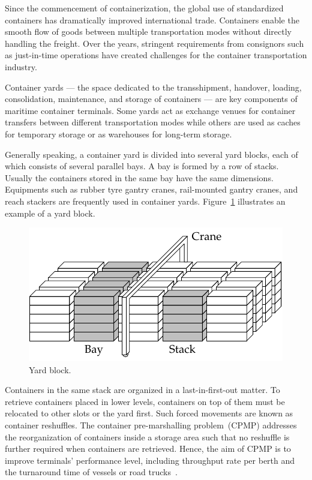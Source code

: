 \documentclass[review,3p,times,12pt,number]{elsarticle}\usepackage{amsmath}\usepackage{amssymb}
\begin{document}
Since the commencement of containerization, the global use of standardized containers has dramatically improved international trade. Containers enable the smooth flow of goods between multiple transportation modes without directly handling the freight. Over the years, stringent requirements from consignors such as just-in-time operations have created challenges for the container transportation industry.

Container yards --- the space dedicated to the transshipment, handover, loading, consolidation, maintenance, and storage of containers --- are key components of maritime container terminals. Some yards act as exchange venues for container transfers between different transportation modes while others are used as caches for temporary storage or as warehouses for long-term storage.

Generally speaking, a container yard is divided into several yard blocks, each of which consists of several parallel bays.  A bay is formed by a row of stacks. Usually the containers stored in the same bay have the same dimensions. Equipments such as rubber tyre gantry cranes, rail-mounted gantry cranes, and reach stackers are frequently used in container yards. Figure~\ref{fig:block} illustrates an example of a yard block.

\begin{figure}[htbp]
\centering
\includegraphics{figs/block.pdf}
\caption{Yard block.}
\label{fig:block}
\end{figure}

Containers in the same stack are organized in a last-in-first-out matter. To retrieve containers placed in lower levels, containers on top of them must be relocated to other slots or the yard first. Such forced movements are known as container reshuffles.
The container pre-marshalling problem~(CPMP) addresses the reorganization of containers inside a storage area such that no reshuffle is further required when containers are retrieved. Hence, the aim of CPMP is to improve terminals' performance level, including throughput rate per berth and the turnaround time of vessels or road trucks~\citep{kim2015}.
\end{document}
